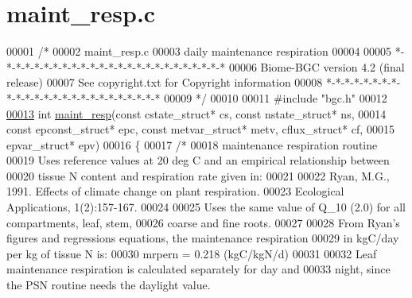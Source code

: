 \hypertarget{maint__resp_8c_source}{}\section{maint\+\_\+resp.\+c}
\label{maint__resp_8c_source}

\begin{DoxyCode}
00001 \textcolor{comment}{/* }
00002 \textcolor{comment}{maint\_resp.c}
00003 \textcolor{comment}{daily maintenance respiration}
00004 \textcolor{comment}{}
00005 \textcolor{comment}{*-*-*-*-*-*-*-*-*-*-*-*-*-*-*-*-*-*-*-*-*-*-*-*-*}
00006 \textcolor{comment}{Biome-BGC version 4.2 (final release)}
00007 \textcolor{comment}{See copyright.txt for Copyright information}
00008 \textcolor{comment}{*-*-*-*-*-*-*-*-*-*-*-*-*-*-*-*-*-*-*-*-*-*-*-*-*}
00009 \textcolor{comment}{*/}
00010 
00011 \textcolor{preprocessor}{#include "bgc.h"}
00012 
\hypertarget{maint__resp_8c_source_l00013}{}\hyperlink{maint__resp_8c_a246899df0f64edd56b2b0ab3cc4f377d}{00013} \textcolor{keywordtype}{int} \hyperlink{maint__resp_8c_a246899df0f64edd56b2b0ab3cc4f377d}{maint\_resp}(\textcolor{keyword}{const} cstate\_struct* cs, \textcolor{keyword}{const} nstate\_struct* ns,
00014 \textcolor{keyword}{const} epconst\_struct* epc, \textcolor{keyword}{const} metvar\_struct* metv, cflux\_struct* cf,
00015 epvar\_struct* epv)
00016 \{
00017     \textcolor{comment}{/*}
00018 \textcolor{comment}{    maintenance respiration routine}
00019 \textcolor{comment}{    Uses reference values at 20 deg C and an empirical relationship between}
00020 \textcolor{comment}{    tissue N content and respiration rate given in:}
00021 \textcolor{comment}{}
00022 \textcolor{comment}{    Ryan, M.G., 1991. Effects of climate change on plant respiration.}
00023 \textcolor{comment}{    Ecological Applications, 1(2):157-167.}
00024 \textcolor{comment}{    }
00025 \textcolor{comment}{    Uses the same value of Q\_10 (2.0) for all compartments, leaf, stem, }
00026 \textcolor{comment}{    coarse and fine roots.}
00027 \textcolor{comment}{    }
00028 \textcolor{comment}{    From Ryan's figures and regressions equations, the maintenance respiration}
00029 \textcolor{comment}{    in kgC/day per kg of tissue N is:}
00030 \textcolor{comment}{    mrpern = 0.218 (kgC/kgN/d)}
00031 \textcolor{comment}{    }
00032 \textcolor{comment}{    Leaf maintenance respiration is calculated separately for day and}
00033 \textcolor{comment}{    night, since the PSN routine needs the daylight value.}

\end{DoxyCode}
